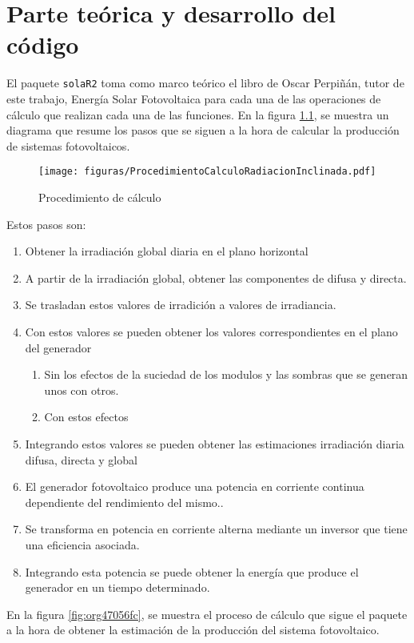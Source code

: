 \chapter{Parte teórica y desarrollo del código}
El paquete \texttt{solaR2} toma como marco teórico el libro de Oscar Perpiñán, tutor de este trabajo, Energía Solar Fotovoltaica \cite{Perpinan2023} para cada una de las operaciones de cálculo que realizan cada una de las funciones.
En la figura \ref{fig:orgb083d1b}, se muestra un diagrama que resume los pasos que se siguen a la hora de calcular la producción de sistemas fotovoltaicos.
\begin{figure}[p]
\centering
\texttt{[image: figuras/ProcedimientoCalculoRadiacionInclinada.pdf]}
\caption{\label{fig:orgb083d1b}Procedimiento de cálculo}
\end{figure}
Estos pasos son:
\begin{enumerate}
\item Obtener la irradiación global diaria en el plano horizontal
\item A partir de la irradiación global, obtener las componentes de difusa y directa.
\item Se trasladan estos valores de irradición a valores de irradiancia.
\item Con estos valores se pueden obtener los valores correspondientes en el plano del generador
\begin{enumerate}
\item Sin los efectos de la suciedad de los modulos y las sombras que se generan unos con otros.
\item Con estos efectos
\end{enumerate}
\item Integrando estos valores se pueden obtener las estimaciones irradiación diaria difusa, directa y global
\item El generador fotovoltaico produce una potencia en corriente continua dependiente del rendimiento del mismo..
\item Se transforma en potencia en corriente alterna mediante un inversor que tiene una eficiencia asociada.
\item Integrando esta potencia se puede obtener la energía que produce el generador en un tiempo determinado.
\end{enumerate}
En la figura \ref{fig:org47056fc}, se muestra el proceso de cálculo que sigue el paquete a la hora de obtener la estimación de la producción del sistema fotovoltaico.
